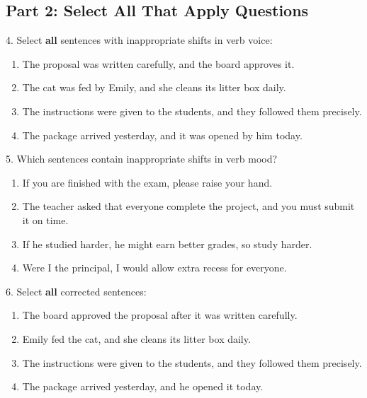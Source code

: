 \documentclass[12pt]{article}
\begin{document}
\vspace{1cm}

\subsection*{Part 2: Select All That Apply Questions}

4. Select \textbf{all} sentences with inappropriate shifts in verb voice:  
\begin{enumerate}[label=\Alph*.]
    \item The proposal was written carefully, and the board approves it.  
    \item The cat was fed by Emily, and she cleans its litter box daily.  
    \item The instructions were given to the students, and they followed them precisely.  
    \item The package arrived yesterday, and it was opened by him today.  
\end{enumerate}

\vspace{1cm}

5. Which sentences contain inappropriate shifts in verb mood?  
\begin{enumerate}[label=\Alph*.]
    \item If you are finished with the exam, please raise your hand.  
    \item The teacher asked that everyone complete the project, and you must submit it on time.  
    \item If he studied harder, he might earn better grades, so study harder.  
    \item Were I the principal, I would allow extra recess for everyone.  
\end{enumerate}

\vspace{1cm}

6. Select \textbf{all} corrected sentences:  
\begin{enumerate}[label=\Alph*.]
    \item The board approved the proposal after it was written carefully.  
    \item Emily fed the cat, and she cleans its litter box daily.  
    \item The instructions were given to the students, and they followed them precisely.  
    \item The package arrived yesterday, and he opened it today.  
\end{enumerate}
\end{document}

